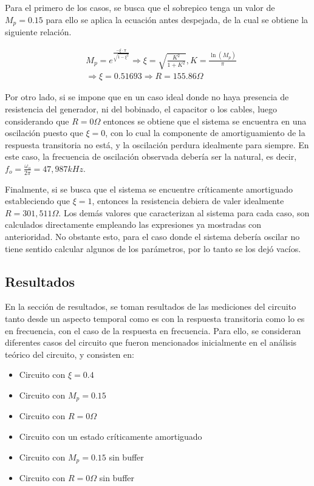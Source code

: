 Para el primero de los casos, se busca que el sobrepico tenga un valor de $M_p = 0.15$ para ello se aplica la ecuaci\'on antes despejada, de la cual
se obtiene la siguiente relaci\'on.

\begin{align}
    & M_p = e^{\frac{- \xi \cdot \pi}{\sqrt{1 - \xi^{2}}}}
    \Rightarrow
    \xi = \sqrt{ \frac{K^{2}}{1 + K^{2}} } , 
    K = \frac{ \ln{(M_p)}}{\pi} \\
    & \Rightarrow \xi = 0.51693 \Rightarrow R = 155.86 \Omega
\end{align}

Por otro lado, si se impone que en un caso ideal donde no haya presencia de resistencia del generador, ni del bobinado, el capacitor o los cables,
luego considerando que $ R = 0 \Omega$ entonces se obtiene que el sistema se encuentra en una oscilaci\'on puesto que $\xi = 0$, con lo cual la componente 
de amortiguamiento de la respuesta transitoria no est\'a, y la oscilaci\'on perdura idealmente para siempre. En este caso, la frecuencia de oscilaci\'on observada deber\'ia
ser la natural, es decir, $f_o = \frac{\omega_o}{2 \pi} = 47,987kHz$.

Finalmente, si se busca que el sistema se encuentre cr\'iticamente amortiguado estableciendo que $\xi = 1$, entonces la resistencia debiera de valer idealmente $R = 301,511 \Omega$. Los dem\'as valores
que caracterizan al sistema para cada caso, son calculados directamente empleando las expresiones ya mostradas con anterioridad. No obstante esto, para el caso donde el sistema deber\'ia oscilar no tiene
sentido calcular algunos de los par\'ametros, por lo tanto se los dej\'o vac\'ios.

\subsection{Resultados}
En la secci\'on de resultados, se toman resultados de las mediciones del circuito tanto desde un aspecto temporal como es con la respuesta transitoria como lo es en frecuencia,
con el caso de la respuesta en frecuencia. Para ello, se consideran diferentes casos del circuito que fueron mencionados inicialmente en el an\'alisis te\'orico del circuito, y 
consisten en:

\begin{itemize}
    \item Circuito con $\xi = 0.4$
    \item Circuito con $M_p = 0.15$
    \item Circuito con $R = 0 \Omega $
    \item Circuito con un estado cr\'iticamente amortiguado
    \item Circuito con $M_p = 0.15$ sin buffer
    \item Circuito con $R = 0 \Omega$ sin buffer
\end{itemize}

